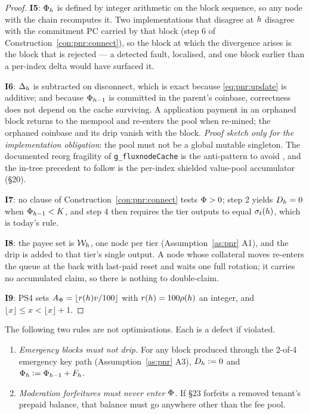 \begin{proof}
\textbf{I5}: $\Phi_{h}$ is defined by integer arithmetic on the block sequence, so any node with
the chain recomputes it. Two implementations that disagree at $h$ disagree with the commitment PC
carried by that block (step 6 of Construction~\ref{con:pnr:connect}), so the block at which the
divergence arises is the block that is rejected --- a detected fault, localised, and one block
earlier than a per-index delta would have surfaced it.

\textbf{I6}: $\Delta_{h}$ is subtracted on disconnect, which is exact because
\eqref{eq:pnr:update} is additive; and because $\Phi_{h-1}$ is committed in the parent's
coinbase, correctness does not depend on the cache surviving. A \PNR application payment in an
orphaned block returns to the mempool and re-enters the pool when re-mined; the orphaned coinbase
and its drip vanish with the block. \emph{Proof sketch only for the implementation obligation}: the
pool must not be a global mutable singleton. The documented reorg fragility of
\texttt{g\_fluxnode\allowbreak{}Cache} is the anti-pattern to avoid
, and the in-tree precedent to follow is the
per-index shielded value-pool accumulator (\S20).

\textbf{I7}: no clause of Construction~\ref{con:pnr:connect} tests $\Phi > 0$; step 2 yields
$D_{h} = 0$ when $\Phi_{h-1} < K$, and step 4 then requires the tier outputs to equal
$\sigma_t(h)$, which is today's rule.

\textbf{I8}: the payee set is $\mathcal{W}_{h}$, one node per tier (Assumption~\ref{as:pnr} A1), and the
drip is added to that tier's single output. A node whose collateral moves re-enters the queue at the
back with last-paid reset and waits one full rotation; it carries no accumulated claim, so there is
nothing to double-claim.

\textbf{I9}: PS4 sets $A_\Phi = \lfloor r(h)v/100\rfloor$ with
$r(h) = 100\rho(h)$ an integer, and $\lfloor x \rfloor \le x < \lfloor x \rfloor + 1$.
\end{proof}

\begin{property}
\label{prop:pnr:exported}
The following two rules are not optimisations. Each is a defect if violated.
\begin{enumerate}
  \item[\textbf{S1}] \emph{Emergency blocks must not drip.} For any block produced through the
    2-of-4 emergency key path (Assumption~\ref{as:pnr} A3), $D_{h} \vcentcolon= 0$ and $\Phi_{h}
    \vcentcolon= \Phi_{h-1} + F_{h}$.
  \item[\textbf{S2}] \emph{Moderation forfeitures must never enter $\Phi$.} If \S23 forfeits a
    removed tenant's prepaid balance, that balance must go anywhere other than the fee pool.
\end{enumerate}
\end{property}


